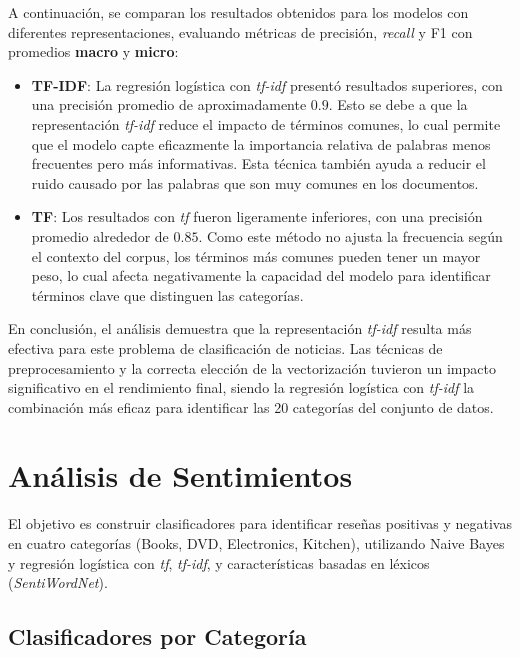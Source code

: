 \documentclass[11pt,english]{article}
\theoremstyle{plain}
\begin{document}
\noindent A continuación, se comparan los resultados obtenidos para los modelos con diferentes representaciones, evaluando métricas de precisión, \textit{recall} y F1 con promedios \textbf{macro} y \textbf{micro}:

\begin{itemize}
    \item \textbf{TF-IDF}: La regresión logística con \textit{tf-idf} presentó resultados superiores, con una precisión promedio de aproximadamente $0.9$. Esto se debe a que la representación \textit{tf-idf} reduce el impacto de términos comunes, lo cual permite que el modelo capte eficazmente la importancia relativa de palabras menos frecuentes pero más informativas. Esta técnica también ayuda a reducir el ruido causado por las palabras que son muy comunes en los documentos.
    \item \textbf{TF}: Los resultados con \textit{tf} fueron ligeramente inferiores, con una precisión promedio alrededor de $0.85$. Como este método no ajusta la frecuencia según el contexto del corpus, los términos más comunes pueden tener un mayor peso, lo cual afecta negativamente la capacidad del modelo para identificar términos clave que distinguen las categorías.
\end{itemize}

\noindent En conclusión, el análisis demuestra que la representación \textit{tf-idf} resulta más efectiva para este problema de clasificación de noticias. Las técnicas de preprocesamiento y la correcta elección de la vectorización tuvieron un impacto significativo en el rendimiento final, siendo la regresión logística con \textit{tf-idf} la combinación más eficaz para identificar las 20 categorías del conjunto de datos.

\section{Análisis de Sentimientos}

El objetivo es construir clasificadores para identificar reseñas positivas y negativas en cuatro categorías (Books, DVD, Electronics, Kitchen), utilizando Naive Bayes y regresión logística con \textit{tf}, \textit{tf-idf}, y características basadas en léxicos (\textit{SentiWordNet}).

\subsection{Clasificadores por Categoría}
\end{document}
